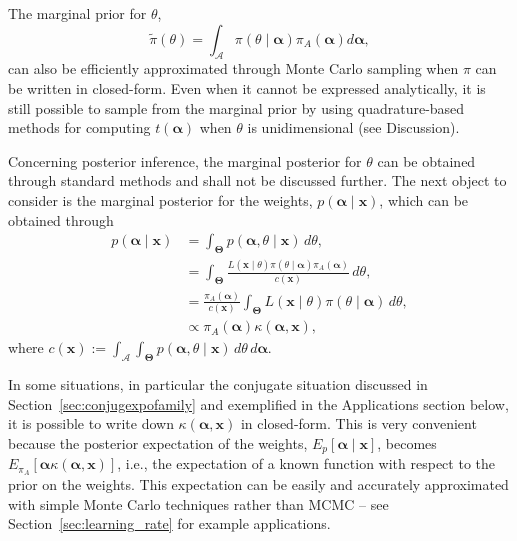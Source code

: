 \documentclass[a4paper, notitlepage, 11pt]{article}
\begin{document}
The marginal prior for $\theta$,
\begin{equation}
\label{eq:marginalbeta}
\tilde{\pi}(\theta) = \int_{\mathcal{A}} \pi(\theta \mid \boldsymbol\alpha) \pi_A(\boldsymbol\alpha)d\boldsymbol\alpha,
\end{equation}
can also be efficiently approximated through Monte Carlo sampling when $\pi$ can be written in closed-form.
Even when it cannot be expressed analytically, it is still possible to sample from the marginal prior by using quadrature-based methods for computing $t(\boldsymbol\alpha)$ when $\theta$ is unidimensional (see Discussion).

Concerning posterior inference, the marginal posterior for $\theta$ can be obtained through standard methods and shall not be discussed further.
The next object to consider is the marginal posterior for the weights, $p(\boldsymbol\alpha \mid \boldsymbol{x})$, which can be obtained through
\begin{align}
\nonumber
 p(\boldsymbol\alpha \mid \boldsymbol{x}) &= \int_{\boldsymbol\Theta} p(\boldsymbol\alpha, \theta \mid \boldsymbol{x})\,d\theta, \\
 \nonumber
 &= \int_{\boldsymbol\Theta} \frac{L(\boldsymbol{x} \mid \theta) \pi(\theta \mid \boldsymbol\alpha)\pi_A(\boldsymbol\alpha)}{c(\boldsymbol{x})}\,d\theta,\\
 \nonumber
 &= \frac{\pi_A(\boldsymbol\alpha)}{c(\boldsymbol{x})} \int_{\boldsymbol\Theta} L(\boldsymbol{x} \mid \theta) \pi(\theta \mid \boldsymbol\alpha)\,d\theta,\\
 \label{eq:marginal_posterior_alpha}
 &\propto \pi_A(\boldsymbol\alpha) \kappa(\boldsymbol\alpha, \boldsymbol{x}),
\end{align}
where $c(\boldsymbol{x}) := \int_{\mathcal{A}}\int_{\boldsymbol\Theta} p(\boldsymbol\alpha, \theta \mid \boldsymbol{x})\,d\theta\,d\boldsymbol{\alpha}$.

In some situations, in particular the conjugate situation discussed in Section~\ref{sec:conjugexpofamily} and exemplified in the Applications section below, it is possible to write down $\kappa(\boldsymbol\alpha, \boldsymbol{x})$ in closed-form.
This is very convenient because the posterior expectation of the weights, $E_p[\boldsymbol\alpha \mid \boldsymbol{x}]$, becomes $E_{\pi_A}[\boldsymbol\alpha \kappa(\boldsymbol\alpha, \boldsymbol{x})]$, i.e., the expectation of a known function with respect to the prior on the weights.
This expectation can be easily and accurately approximated with simple Monte Carlo techniques rather than MCMC -- see Section~\ref{sec:learning_rate} for example applications.
\end{document}
